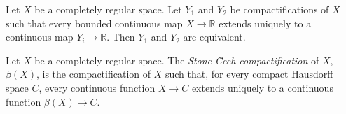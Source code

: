 \begin{cor}
Let $X$ be a completely regular space. Let $Y_1$ and $Y_2$ be compactifications of $X$ such that every bounded continuous map $X \rightarrow \mathbb{R}$
extends uniquely to a continuous map $Y_i \rightarrow \mathbb{R}$. Then $Y_1$ and $Y_2$ are equivalent.
\end{cor}

\begin{df}
Let $X$ be a completely regular space. The \emph{Stone-\u{C}ech compactification} of $X$, $\beta(X)$, is the compactification of $X$ such that, for every compact Hausdorff space $C$,
every continuous function $X \rightarrow C$ extends uniquely to a continuous function $\beta(X) \rightarrow C$.
\end{df}
